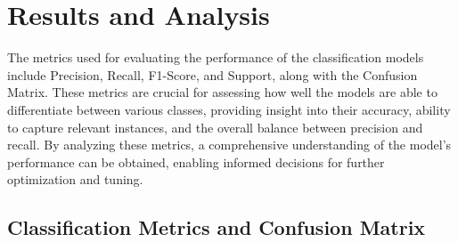 


\section{Results and Analysis}




\noindent
The metrics used for evaluating the performance of the classification models include Precision, Recall, F1-Score, and Support, along with the Confusion Matrix. These metrics are crucial for assessing how well the models are able to differentiate between various classes, providing insight into their accuracy, ability to capture relevant instances, and the overall balance between precision and recall. By analyzing these metrics, a comprehensive understanding of the model's performance can be obtained, enabling informed decisions for further optimization and tuning.

\subsection{Classification Metrics and Confusion Matrix}


